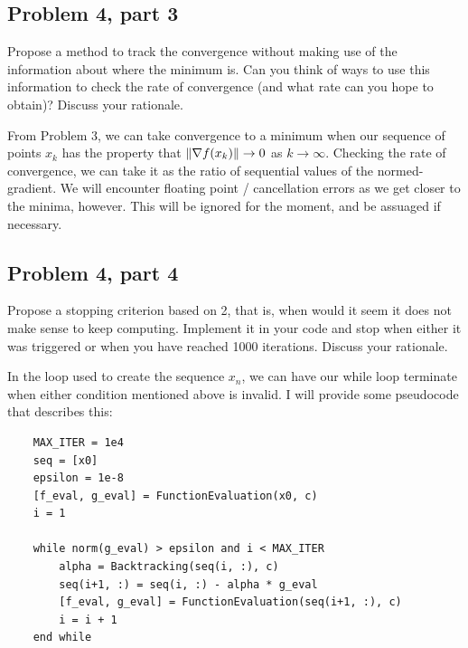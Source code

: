 \subsection{Problem 4, part 3}
Propose a method to track the convergence without making use of the information about where the minimum is. Can you think of ways to use this information to check the rate of convergence (and what rate can you hope to obtain)? Discuss your rationale.
\partbreak
\begin{solution}

    From Problem 3, we can take convergence to a minimum when our sequence of points $x_k$ has the property that $\norm{\nabla f(x_k)} \rightarrow 0$ as $k \rightarrow \infty$. Checking the rate of convergence, we can take it as the ratio of sequential values of the normed-gradient. We will encounter floating point / cancellation errors as we get closer to the minima, however. This will be ignored for the moment, and be assuaged if necessary. 
\end{solution}

\newpage
\subsection{Problem 4, part 4}
Propose a stopping criterion based on 2, that is, when would it seem it does not make sense to keep computing. Implement it in your code and stop when either it was triggered or when you have reached 1000 iterations. Discuss your rationale.
\partbreak
\begin{solution}

    In the loop used to create the sequence $x_n$, we can have our while loop terminate when either condition mentioned above is invalid. I will provide some pseudocode that describes this:
    \begin{lstlisting}
    MAX_ITER = 1e4
    seq = [x0]
    epsilon = 1e-8
    [f_eval, g_eval] = FunctionEvaluation(x0, c)
    i = 1

    while norm(g_eval) > epsilon and i < MAX_ITER
        alpha = Backtracking(seq(i, :), c)
        seq(i+1, :) = seq(i, :) - alpha * g_eval
        [f_eval, g_eval] = FunctionEvaluation(seq(i+1, :), c) 
        i = i + 1 
    end while

    \end{lstlisting}
        
\end{solution}

\newpage
